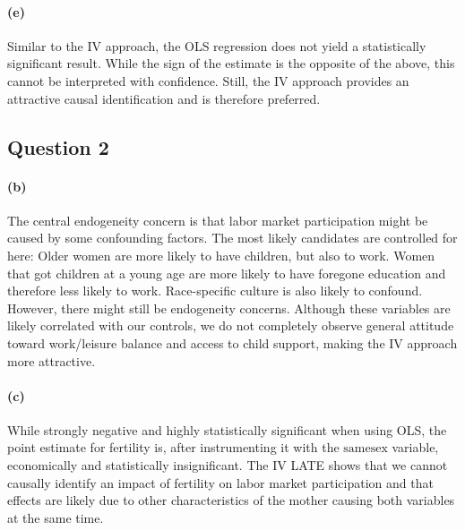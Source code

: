 \documentclass{scrartcl}
\begin{document}
\paragraph*{(e)}

Similar to the IV approach, the OLS regression does not yield a statistically significant result. While the sign of the estimate is the opposite of the above, this cannot be interpreted with confidence. Still, the IV approach provides an attractive causal identification and is therefore preferred.

\subsection*{Question 2}



\paragraph*{(b)}

The central endogeneity concern is that labor market participation might be caused by some confounding factors. The most likely candidates are controlled for here: Older women are more likely to have children, but also to work. Women that got children at a young age are more likely to have foregone education and therefore less likely to work. Race-specific culture is also likely to confound. However, there might still be endogeneity concerns. Although these variables are likely correlated with our controls, we do not completely observe general attitude toward work/leisure balance and access to child support, making the IV approach more attractive.

\paragraph*{(c)}

While strongly negative and highly statistically significant when using OLS, the point estimate for fertility is, after instrumenting it with the $\text{samesex}$ variable, economically and statistically insignificant. The IV LATE shows that we cannot causally identify an impact of fertility on labor market participation and that effects are likely due to other characteristics of the mother causing both variables at the same time.
\end{document}
